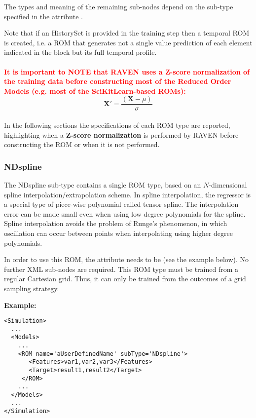 The types and meaning of the remaining sub-nodes depend on the sub-type
specified in the attribute .

%
Note that if an HistorySet is provided in the training step then a temporal ROM is created, i.e. a ROM that generates not a single value prediction of each element indicated in the   block but its full temporal profile.
\\
\textcolor{red}{\\\textbf{It is important to NOTE that RAVEN uses a Z-score normalization of the training data before constructing most of the
Reduced Order Models (e.g. most of the SciKitLearn-based ROMs):}}
\begin{equation}
  \mathit{\mathbf{X'}} = \frac{(\mathit{\mathbf{X}}-\mu )}{\sigma }
\end{equation}
\\In the following sections the specifications of each ROM type are reported, highlighting when a \textbf{Z-score normalization} is performed by RAVEN before constructing the ROM or when it is not performed.

%
\subsubsection{NDspline}
\label{subsubsec:NDspline}
The NDspline sub-type contains a single ROM type, based on an $N$-dimensional
spline interpolation/extrapolation scheme.
%
In spline interpolation, the regressor is a special type of piece-wise
polynomial called tensor spline.
%
The interpolation error can be made small even when using low degree polynomials
for the spline.
%
Spline interpolation avoids the problem of Runge's phenomenon, in which
oscillation can occur between points when interpolating using higher degree
polynomials.
%

In order to use this ROM, the  attribute  needs to
be  (see the example below).
%
No further XML sub-nodes are required.
%
\nb This ROM type must be trained from a regular Cartesian grid.
%
Thus, it can only be trained from the outcomes of a grid sampling strategy.


\textbf{Example:}
\begin{lstlisting}[style=XML,morekeywords={name,subType}]
<Simulation>
  ...
  <Models>
    ...
    <ROM name='aUserDefinedName' subType='NDspline'>
       <Features>var1,var2,var3</Features>
       <Target>result1,result2</Target>
     </ROM>
    ...
  </Models>
  ...
</Simulation>
\end{lstlisting}

